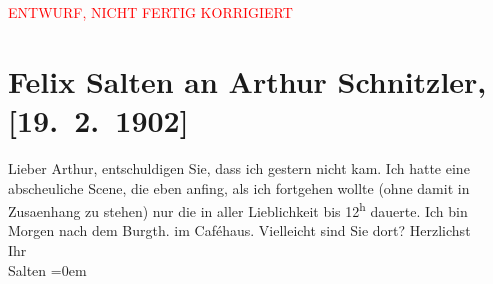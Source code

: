 
\begin{center}
            \textcolor{red}{ENTWURF, NICHT FERTIG KORRIGIERT}
                      \end{center}
            
         \renewcommand{\erwaehnteOrte}{Orte: Burgtheater, Wien}
         \renewcommand{\erwaehnteWerke}{}
               \section[Felix Salten an Arthur Schnitzler, {[}19. 2. 1902{]}]{ Felix Salten an Arthur Schnitzler, {[}19. 2. 1902{]}}\nopagebreak{}\rehead{ }\begin{ledgroupsized}[t]{13cm}\normalsize\beginnumbering \toendnotes[C]{\smallbreak\pagebreak[2]} 
\pstart
           \noindent{}{\pb}Lieber Arthur, entschuldigen Sie, dass ich gestern nicht kam. Ich
               hatte eine abscheuliche Scene, die eben anfing, als ich fortgehen wollte (ohne damit
               in Zusa{\geminationm}enhang zu stehen) nur die in aller Lieblichkeit
                  {\pb}bis 12\textsuperscript{h} dauerte. \pend
           \pstart
           Ich bin Morgen nach dem Burgth. im
               Caféhaus. Vielleicht sind Sie dort? \pend
           \pstart
           Herzlichst {\\[\baselineskip]}Ihr {\\[\baselineskip]}\spacefill\mbox{Salten}\pend
           \leftskip=0em{}
         
         \endnumbering{}\end{ledgroupsized}\begin{anhang}\end{anhang}\newcommand{\dateiname}{L03323}\newcommand{\titel}{Felix Salten an Arthur Schnitzler, [19. 2. 1902]}\newcommand{\editorInnen}{Martin Anton Müller und Laura Untner}
      